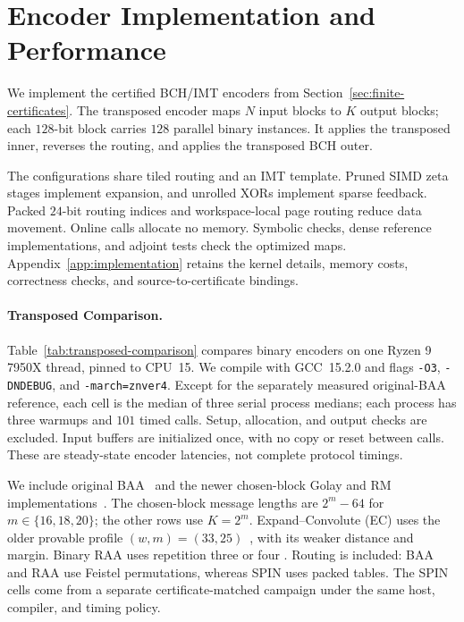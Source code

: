 \section{Encoder Implementation and Performance}
\label{sec:implementation}
\label{sec:transposed-comparison}

We implement the certified BCH/IMT encoders from
Section~\ref{sec:finite-certificates}. The transposed encoder maps $N$
input blocks to $K$ output blocks; each $128$-bit block carries $128$
parallel binary instances. It applies the transposed inner, reverses the
routing, and applies the transposed BCH outer.

The configurations share tiled routing and an IMT template. Pruned SIMD
zeta stages implement expansion, and unrolled XORs implement sparse
feedback. Packed $24$-bit routing indices and workspace-local page routing
reduce data movement. Online calls allocate no memory.
Symbolic checks, dense reference implementations, and adjoint tests check
the optimized maps. Appendix~\ref{app:implementation} retains the kernel
details, memory costs, correctness checks, and source-to-certificate bindings.

\paragraph{Transposed Comparison.}
Table~\ref{tab:transposed-comparison} compares binary encoders on one
Ryzen 9 7950X thread, pinned to CPU~15.
We compile with GCC~15.2.0 and flags \texttt{-O3}, \texttt{-DNDEBUG},
and \texttt{-march=znver4}. Except for the separately measured original-BAA
reference, each cell is the median of three
serial process medians; each process has three warmups and $101$ timed calls.
Setup, allocation, and output checks are excluded. Input buffers are
initialized once, with no copy or reset between calls. These are
steady-state encoder latencies, not complete protocol timings.

We include original BAA~\cite{KolesnikovEtAl2026BA} and the newer
chosen-block Golay and RM implementations~\cite{cryptoeprint:2026/1903}.
The chosen-block message lengths are $2^m-64$ for
$m\in\{16,18,20\}$; the other rows use $K=2^m$.
Expand--Convolute (EC) uses the older provable profile
$(w,m)=(33,25)$~\cite{RaghuramanRindalTanguy2023EC}, with its weaker
distance and margin. Binary RAA uses repetition three or four
\cite{blaze25}. Routing is included: BAA and RAA use Feistel permutations,
whereas SPIN uses packed tables. The SPIN cells come from a separate
certificate-matched campaign under the same host, compiler, and timing policy.


